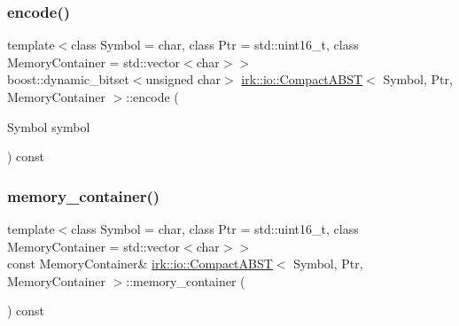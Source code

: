 \mbox{\label{classirk_1_1io_1_1CompactABST_a38b8b4a08ef2b7513d2dac5cd15c9f31}} 
\subsubsection{\texorpdfstring{encode()}{encode()}\hspace{0.1cm}{\footnotesize\ttfamily [3/3]}}
{\footnotesize\ttfamily template$<$class Symbol = char, class Ptr = std\+::uint16\+\_\+t, class Memory\+Container = std\+::vector$<$char$>$$>$ \\
boost\+::dynamic\+\_\+bitset$<$unsigned char$>$ \mbox{\hyperlink{classirk_1_1io_1_1CompactABST}{irk\+::io\+::\+Compact\+A\+B\+ST}}$<$ Symbol, Ptr, Memory\+Container $>$\+::encode (\begin{DoxyParamCaption}\item[{Symbol}]{symbol }\end{DoxyParamCaption}) const\hspace{0.3cm}{\ttfamily [inline]}}

\mbox{\label{classirk_1_1io_1_1CompactABST_a2a9213d54020cf0f293a8a8b40fefc95}} 
\subsubsection{\texorpdfstring{memory\+\_\+container()}{memory\_container()}}
{\footnotesize\ttfamily template$<$class Symbol = char, class Ptr = std\+::uint16\+\_\+t, class Memory\+Container = std\+::vector$<$char$>$$>$ \\
const Memory\+Container\& \mbox{\hyperlink{classirk_1_1io_1_1CompactABST}{irk\+::io\+::\+Compact\+A\+B\+ST}}$<$ Symbol, Ptr, Memory\+Container $>$\+::memory\+\_\+container (\begin{DoxyParamCaption}{ }\end{DoxyParamCaption}) const\hspace{0.3cm}{\ttfamily [inline]}}

\mbox{\label{classirk_1_1io_1_1CompactABST_ae36a68eca86403a1441109c1bbac4321}} 
